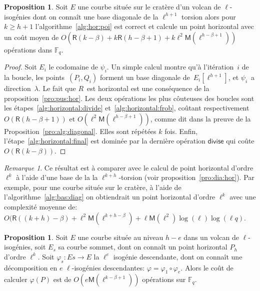 \documentclass[10pt,a4paper]{book}
\theoremstyle{plain}
\theoremstyle{definition}
\theoremstyle{definition}
\theoremstyle{definition}
\theoremstyle{definition}
\newtheorem{prop}[thm]{Proposition}
\theoremstyle{definition}
\theoremstyle{remark}
\newtheorem{rem}[thm]{Remarque}
\theoremstyle{remark}
\theoremstyle{definition}
\begin{document}
\begin{prop}\label{pro:alg:hor}
Soit $E$ une courbe située sur le cratère d'un volcan de $\ell$-isogénies dont 
on connaît une base diagonale de la $\ell^{h+1}$ torsion alors pour 
$k \geqslant h+1$ l'algorithme~\ref{alg:hor:poi} est correct et calcule un 
point horizontal avec un coût moyen de $O(\mathsf{R}(k-\beta) + k\mathsf{R}(h-\beta+1) + k\ell^2\mathsf{M}(\ell^{h-\beta+1}))$
  opérations dans $\mathbb{F}_q$.
\end{prop}
\begin{proof}
Soit $E_i$ le codomaine de $\psi_i$.
Un simple calcul montre qu'à  l'itération~$i$ de la boucle,
les points~$(P_i, Q_i)$ forment un base diagonale de~$E_i[\ell^{h+1}]$,
et $\psi_i$~a direction~$\lambda$.
Le fait que $R$~est horizontal est une conséquence
de la proposition~\ref{pro:pus:hor}.
Les deux opérations les plus côuteuses des boucles sont les
étapes~\ref{alg:horizontal:divide} et~\ref{alg:horizontal:frob},
coûtant respectivement $O(\mathsf{R}(h-\beta+1))$ et 
$O(\ell^2\mathsf{M}(\ell^{h-\beta+1}))$, comme
dit dans la preuve de la Proposition~\ref{pro:alg:diagonal}. Elles sont 
répétées $k$ fois. Enfin, l'étape~\ref{alg:horizontal:final} est
dominée par la dernière opération $\mathsf{divise}$ qui coûte $O(\mathsf{R}(k-\beta))$.
\end{proof}

\begin{rem}
Ce résultat est à comparer avec le calcul de point horizontal d'ordre $\ell^k$ 
à l'aide d'une base de la la $\ell^{k+h}$-torsion (voir 
proposition~\ref{pro:dia:hor}). Par exemple, pour une 
courbe située sur le cratère, à l'aide de l'algorithme~\ref{alg:bas:diag} on 
obtiendrait un point horizontal d'ordre $\ell^k$ avec une complexité moyenne 
de: $O(\mathsf{R}((k+h)-\beta)+\ell^{2}
\mathsf{M}(\ell^{k+h-\beta})+\ell\mathsf{M}(\ell^2)\log(\ell)\log(\ell q)$.
\end{rem}

\begin{prop}
\label{pro:par:hor}
Soit $E$ une courbe située au niveau $h-e$ dans un volcan de $\ell$-isogénies, 
soit $E_s$ sa courbe sommet, dont on connaît un point horizontal $P_h$ d'ordre 
$\ell^k$. Soit $\varphi_s:Es \rightarrow E $ la $\ell^{e}$ isogénie descendante,
dont on connaît une décomposition en $e$ $\ell$-isogénies descendantes: 
$\varphi=\varphi_1 \circ \varphi_{e}$. Alors le coût de calculer $\varphi(P)$ 
est de $O(e\mathsf{M}(\ell^{k-\beta+1}))$ opérations sur $\mathbb{F}_q$.
\end{prop}
\end{document}
